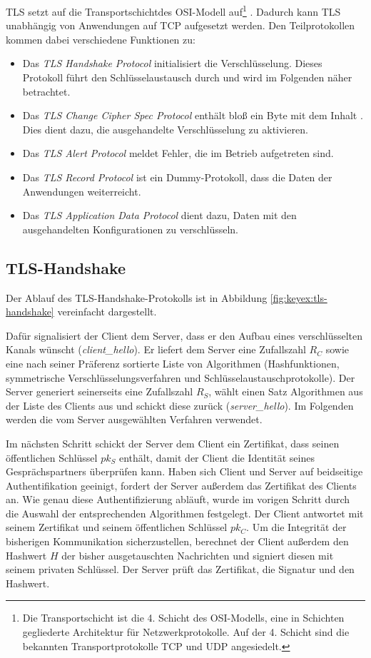 TLS setzt auf die Transportschicht\indexTransportSchicht des OSI-Modell
auf\footnote{Die 
  Transportschicht ist die 4. Schicht des OSI-Modells, eine in Schichten
  gegliederte Architektur für Netzwerkprotokolle. Auf der 4. Schicht
  sind die bekannten Transportprotokolle TCP und UDP angesiedelt.}
. Dadurch kann TLS unabhängig von Anwendungen auf TCP aufgesetzt
werden. Den Teilprotokollen kommen dabei verschiedene Funktionen zu:
\begin{itemize}
\item Das \emph{TLS Handshake Protocol} initialisiert die
  Verschlüsselung. Dieses Protokoll führt den Schlüsselaustausch durch
  und wird im Folgenden näher betrachtet.
\item Das \emph{TLS Change Cipher Spec Protocol} enthält bloß ein Byte
  mit dem Inhalt \grqq. Dies dient dazu, die ausgehandelte
  Verschlüsselung zu aktivieren.
\item Das \emph{TLS Alert Protocol} meldet Fehler, die im Betrieb
  aufgetreten sind.
\item Das \emph{TLS Record Protocol} ist ein Dummy-Protokoll, dass die
  Daten der Anwendungen weiterreicht.
\item Das \emph{TLS Application Data Protocol} dient dazu, Daten mit den
  ausgehandelten Konfigurationen zu verschlüsseln.
\end{itemize}

\subsection{TLS-Handshake}\indexTLSHandshake 
Der Ablauf des TLS-Handshake-Protokolls ist in Abbildung
\ref{fig:keyex:tls-handshake} vereinfacht dargestellt.

Dafür signalisiert der Client dem Server, dass er den Aufbau eines
verschlüsselten Kanals wünscht (\emph{client\_hello}). Er liefert dem
Server eine Zufallszahl $R_C$ sowie eine nach seiner Präferenz sortierte
Liste von Algorithmen (Hashfunktionen, symmetrische
Verschlüsselungsverfahren und Schlüsselaustauschprotokolle). Der Server
generiert seinerseits eine Zufallszahl $R_S$, wählt einen Satz
Algorithmen aus der Liste des Clients aus und schickt diese zurück
(\emph{server\_hello}). Im Folgenden werden die vom Server ausgewählten
Verfahren verwendet.

Im nächsten Schritt schickt der Server dem Client ein Zertifikat, dass
seinen öffentlichen Schlüssel $pk_S$ enthält, damit der Client
die Identität seines Gesprächspartners überprüfen kann. Haben sich
Client und Server auf beidseitige Authentifikation geeinigt, fordert der
Server außerdem das Zertifikat des Clients an.  Wie genau diese
Authentifizierung abläuft, wurde im vorigen Schritt durch die Auswahl
der entsprechenden Algorithmen festgelegt. Der Client antwortet mit
seinem Zertifikat und seinem öffentlichen Schlüssel $pk_C$. Um die
Integrität der bisherigen Kommunikation sicherzustellen, berechnet der
Client außerdem den Hashwert $H$ der bisher ausgetauschten Nachrichten
und signiert diesen mit seinem privaten Schlüssel. Der Server prüft das
Zertifikat, die Signatur und den Hashwert.

